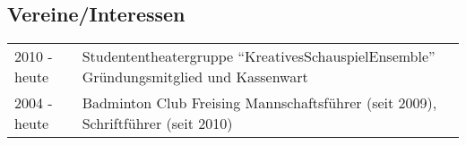 \documentclass[a4paper,10pt]{memoir}
\begin{document}
\subsection*{Vereine/Interessen}
\vspace*{-\baselineskip}
\begin{longtable}{@{}p{} p{}}
  2010 - heute &
  Studententheatergruppe ``KreativesSchauspielEnsemble'' \newline
  Gründungsmitglied und Kassenwart
  \\
  2004 - heute &
  Badminton Club Freising \newline
  Mannschaftsführer (seit 2009), Schriftführer (seit 2010)
\end{longtable}
\end{document}
